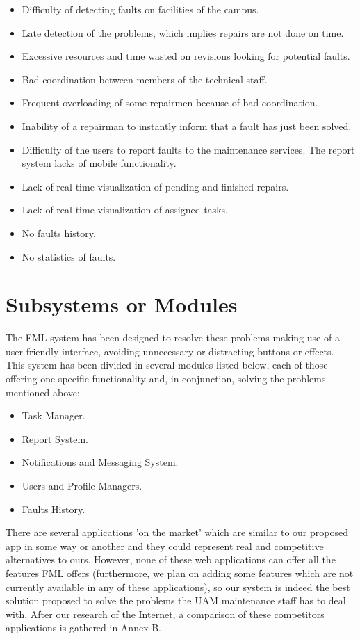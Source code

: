 \documentclass{report}
\begin{document}
\begin{itemize}
\item Difficulty of detecting faults on facilities of the campus.
\item Late detection of the problems, which implies repairs are not done on time.
\item Excessive resources and time wasted on revisions looking for potential faults.
\item Bad coordination between members of the technical staff.
\item Frequent overloading of some repairmen because of bad coordination.
\item Inability of a repairman to instantly inform that a fault has just been solved.
\item Difficulty of the users to report faults to the maintenance services.
The report system lacks of mobile functionality.
\item Lack of real-time visualization of pending and finished repairs.
\item Lack of real-time visualization of assigned tasks.
\item No faults history.
\item No statistics of faults.
\end{itemize}

\section{Subsystems or Modules}

The FML system has been designed to resolve these problems making use of a user-friendly interface, avoiding unnecessary or distracting buttons or effects. This system has been divided in several modules listed below, each of those offering one specific functionality and, in conjunction, solving the problems mentioned above:
\begin{itemize}
\item Task Manager.
\item Report System.
\item Notifications and Messaging System.
\item Users and Profile Managers.
\item Faults History.
\end{itemize}

There are several applications 'on the market' which are similar to our proposed app in some way or another and they could represent real and competitive alternatives to ours. However, none of these web applications can offer all the features FML offers (furthermore, we plan on adding some features which are not currently available in any of these applications), so our system is indeed the best solution proposed to solve the problems the UAM maintenance staff has to deal with. After our research of the Internet, a comparison of these competitors applications is gathered in Annex B.
\end{document}
